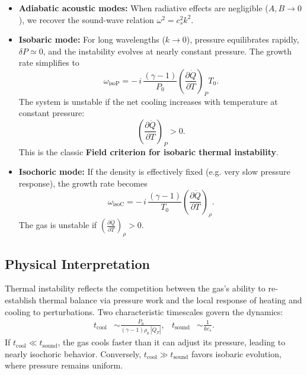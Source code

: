 \begin{itemize}
    \item \textbf{Adiabatic acoustic modes:}  
    When radiative effects are negligible ($A,B\to0$), we recover the sound-wave relation 
    $\omega^2 = c_s^2 k^2$.
    
    \item \textbf{Isobaric mode:}  
    For long wavelengths ($k \to 0$), pressure equilibrates rapidly, $\delta P \simeq 0$, and the instability evolves at nearly constant pressure.  
    The growth rate simplifies to
    \begin{equation}
    \boxed{
    \omega_{\text{isoP}} = -\,i\,\frac{(\gamma - 1)}{P_0}
    \left(\frac{\partial \dot{Q}}{\partial T}\right)_P T_0.
    }
    \end{equation}
    The system is unstable if the net cooling increases with temperature at constant pressure:
    \[
    \left(\frac{\partial \dot{Q}}{\partial T}\right)_P > 0.
    \]
    This is the classic \textbf{Field criterion for isobaric thermal instability}.
    
    \item \textbf{Isochoric mode:}  
    If the density is effectively fixed (e.g. very slow pressure response), the growth rate becomes
    \begin{equation}
    \boxed{
    \omega_{\text{isoC}} = -\,i\,\frac{(\gamma - 1)}{T_0}
    \left(\frac{\partial \dot{Q}}{\partial T}\right)_\rho.
    }
    \end{equation}
    The gas is unstable if $\left(\frac{\partial \dot{Q}}{\partial T}\right)_\rho > 0$.
\end{itemize}

\subsection*{Physical Interpretation}

Thermal instability reflects the competition between the gas’s ability to re-establish thermal balance via pressure work and the local response of heating and cooling to perturbations.  
Two characteristic timescales govern the dynamics:
\begin{align}
t_{\mathrm{cool}} &\sim \frac{P_0}{(\gamma - 1)\rho_0\,|\dot{Q}_T|}, &
t_{\mathrm{sound}} &\sim \frac{1}{k c_s}.
\end{align}
If $t_{\mathrm{cool}} \ll t_{\mathrm{sound}}$, the gas cools faster than it can adjust its pressure, leading to nearly isochoric behavior.  
Conversely, $t_{\mathrm{cool}} \gg t_{\mathrm{sound}}$ favors isobaric evolution, where pressure remains uniform.

